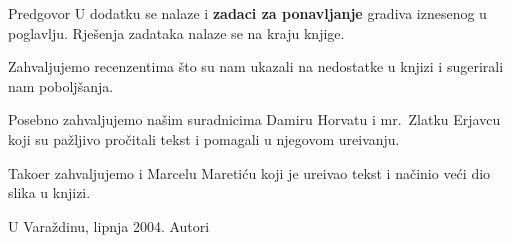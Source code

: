 \begin{preface}{Predgovor}
U dodatku se nalaze i \textbf{zadaci za ponavljanje} gradiva
iznesenog u poglavlju. Rje\v{s}enja zadataka nalaze se na kraju
knjige.

\medskip

 Zahvaljujemo   recenzentima \v{s}to su nam ukazali na
nedostatke u knjizi i sugerirali nam pobolj\v{s}anja.

Posebno   zahvaljujemo na\v{s}im suradnicima Damiru Horvatu i
mr.~Zlatku Erjavcu koji su pa\v{z}ljivo pro\v{c}itali tekst i
pomagali u njegovom ure\dj{}ivanju.

Tako\dj{}er   zahvaljujemo i Marcelu Mareti\'cu koji je
ure\dj{}ivao tekst i na\v{c}inio ve\'ci dio slika u knjizi.
\bigskip

U Vara\v{z}dinu, lipnja 2004. \hfill Autori


\end{preface}


\thispagestyle{plain}
